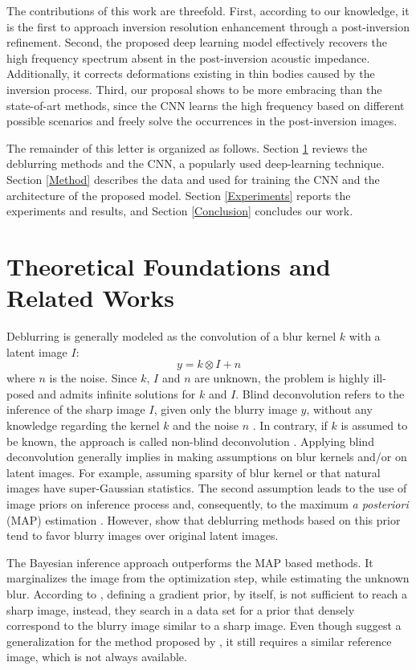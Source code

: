 \documentclass[journal]{IEEEtran}
\begin{document}
The contributions of this work are threefold. First,
according to our knowledge, it is the first to approach
inversion resolution enhancement through a post-inversion
refinement. Second, the proposed deep learning model
effectively recovers the high frequency spectrum absent
in the post-inversion acoustic impedance. Additionally, it
corrects deformations existing in thin bodies caused
by the inversion process. Third, our proposal
shows to be more embracing than the state-of-art
methods, since the CNN learns the high frequency
based on different possible scenarios and freely solve
the occurrences in the post-inversion images.

The remainder of this letter is organized as follows.
Section \ref{Theoretics} reviews the deblurring methods
and the CNN, a popularly used deep-learning technique.
Section \ref{Method} describes the data and used for
training the CNN and the architecture of the proposed model.
Section \ref{Experiments} reports the experiments and
results, and Section \ref{Conclusion} concludes our work.

\section{Theoretical Foundations and Related Works}\label{Theoretics}
Deblurring is generally modeled as the convolution of a blur kernel $k$
with a latent image $I$: 
\begin{equation}
 y = k \otimes I + n
 \label{eq:deblurr}
\end{equation}
where $n$ is the noise. Since $k$, $I$ and $n$ are unknown, the problem 
is highly ill-posed and admits infinite solutions for $k$ and $I$.
Blind deconvolution refers to the inference of the sharp image $I$,
given only the blurry image $y$, without any knowledge regarding the
kernel $k$ and the noise $n$ \cite{Zhang2013}. In contrary, if $k$
is assumed to be known, the approach is called non-blind deconvolution
\cite{Wang2009}.
Applying blind deconvolution generally implies in making assumptions
on blur kernels and/or on latent images. For example, assuming sparsity
of blur kernel or that natural images have super-Gaussian statistics.
The second assumption leads to the use of image priors on inference process
and, consequently, to the maximum \textit{a posteriori} (MAP) estimation
\cite{Babacan2012}. However, \cite{Levin} show that deblurring methods based
on this prior tend to favor blurry images over original latent images.

The Bayesian inference approach \cite{Levin} outperforms the MAP based
methods. It marginalizes the image from the optimization step, while
estimating the unknown blur.
According to \cite{Hacohen13}, defining a gradient prior, by itself,
is not sufficient to reach a sharp image, instead, they search in a data
set for a prior that densely correspond to the blurry image similar
to a sharp image. Even though \cite{Pan2014} suggest a generalization
for the method proposed by \cite{Hacohen13}, it still requires a similar
reference image, which is not always available.
\end{document}
